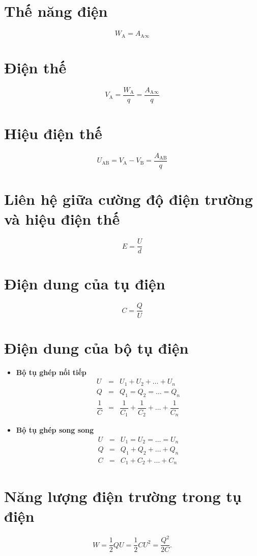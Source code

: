 \begin{minipage}[l]{0.45\textwidth}
	\section{Thế năng điện}
	$$W_\text{A}=A_{\text{A}\infty}$$
	\section{Điện thế}
	$$V_\text{A}=\dfrac{W_\text{A}}{q}=\dfrac{A_{\text{A}\infty}}{q}$$
	\section{Hiệu điện thế}
	$$U_\text{AB}=V_\text{A}-V_\text{B}=\dfrac{A_\text{AB}}{q}$$
	\section{Liên hệ giữa cường độ điện trường và hiệu điện thế}
	$$E=\dfrac{U}{d}$$
	\section{Điện dung của tụ điện}
	$$C=\dfrac{Q}{U}$$
	\section{Điện dung của bộ tụ điện}
	\begin{itemize}
		\item \textbf{Bộ tụ ghép nối tiếp}
		\begin{eqnarray*}
			U&=&U_1+U_2+\dots+U_n\\
			Q&=&Q_1=Q_2=\dots=Q_n\\
			\dfrac{1}{C}&=&\dfrac{1}{C_1}+\dfrac{1}{C_2}+\dots+\dfrac{1}{C_n}
		\end{eqnarray*}
	\item \textbf{Bộ tụ ghép song song}
	\begin{eqnarray*}
		U&=&U_1=U_2=\dots=U_n\\
		Q&=&Q_1+Q_2+\dots+Q_n\\
		C&=&C_1+C_2+\dots+C_n
	\end{eqnarray*}
	\end{itemize}
\end{minipage}
\section{Năng lượng điện trường trong tụ điện}
$$W=\dfrac{1}{2}QU=\dfrac{1}{2}CU^2=\dfrac{Q^2}{2C}.$$
